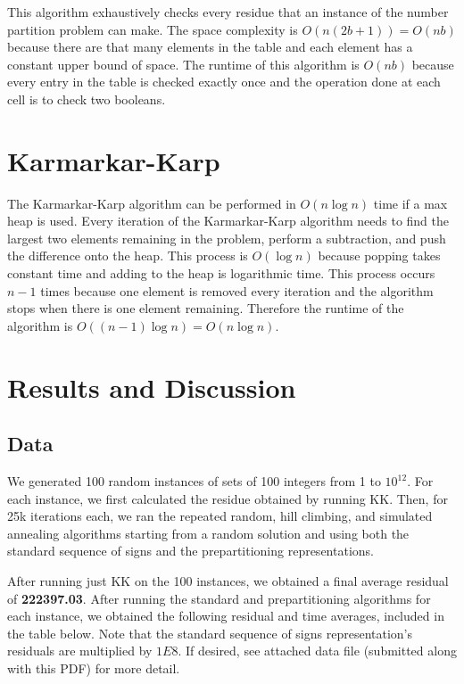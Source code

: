 \documentclass[a4paper]{article}
\begin{document}
	This algorithm exhaustively checks every residue that an instance of the number partition problem can make. The space complexity is $O(n(2b+1)) = O(nb)$ because there are that many elements in the table and each element has a constant upper bound of space. The runtime of this algorithm is $O(nb)$ because every entry in the table is checked exactly once and the operation done at each cell is to check two booleans.
	
	\section{Karmarkar-Karp}
	The Karmarkar-Karp algorithm can be performed in $O(n\log n)$ time if a max heap is used. Every iteration of the Karmarkar-Karp algorithm needs to find the largest two elements remaining in the problem, perform a subtraction, and push the difference onto the heap. This process is $O(\log n)$ because popping takes constant time and adding to the heap is logarithmic time. This process occurs $n-1$ times because one element is removed every iteration and the algorithm stops when there is one element remaining. Therefore the runtime of the algorithm is $O((n-1) \log n) = O(n\log n)$.
	
	\section{Results and Discussion}
	\subsection{Data}
	We generated 100 random instances of sets of 100 integers from 1 to $10^{12}$. For each instance, we first calculated the residue obtained by running KK. Then, for 25k iterations each, we ran the repeated random, hill climbing, and simulated annealing algorithms starting from a random solution and using both the standard sequence of signs and the prepartitioning representations. 
	
	After running just KK on the 100 instances, we obtained a final average residual of \textbf{222397.03}. After running the standard and prepartitioning algorithms for each instance, we obtained the following residual and time averages, included in the table below. Note that the standard sequence of signs representation's residuals are multiplied by $1E8$. If desired, see attached data file (submitted along with this PDF) for more detail. 
	
\end{document}
